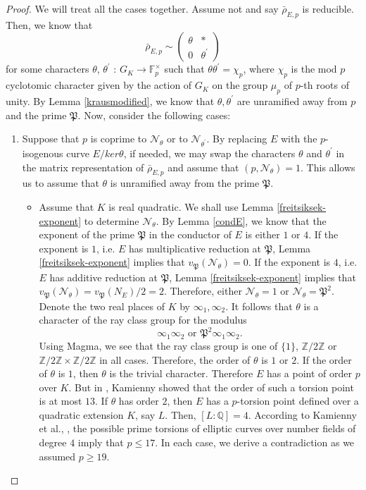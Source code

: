 \documentclass[]{article}
\newcommand {\ZZ}{{\mathbb{Z}}}
\newcommand {\QQ}{{\mathbb{Q}}}
\newcommand {\mfp}{{\mathfrak{P}}}
\newcounter{cases}
\begin{document}
\begin{proof}
We will treat all the cases together. Assume not and say $\bar{\rho}_{E, p}$ is reducible. Then, we know that $$
\bar{\rho}_{E, p} \sim\left(\begin{array}{cc}
\theta & * \\
0 & \theta^{\prime}
\end{array}\right)
$$
for some characters $\theta$, $\theta^{\prime}$ : $G_K \rightarrow \mathbb{F}_p^{\times}$ such that $\theta \theta^{\prime}=\chi_p$, where $\chi_p$ is the mod $p$ cyclotomic character given by the action of $G_K$ on the group $\mu_p$ of $p$-th roots of unity.
By Lemma \ref{krausmodified}, we know that $\theta, \theta^{\prime}$ are unramified away from $p$ and the prime $\mfp$. Now, consider the following cases:

\begin{enumerate}
    \item Suppose that $p$ is coprime to  $\mathcal{N}_\theta$ or to $\mathcal{N}_{\theta^{\prime}}$. By replacing $E$ with the $p$-isogenous curve $E/ker\theta$, if needed, we may swap the characters $\theta$ and $\theta^{\prime}$ in the matrix representation of $\bar{\rho}_{E, p}$ and assume that $(p, \mathcal{N}_\theta)=1$. This allows us to assume that $\theta$ is unramified away from the prime $\mfp$. 

    \begin{itemize}
        \item Assume that $K$ is real quadratic. We shall use Lemma \ref{freitsiksek-exponent} to determine $\mathcal{N}_\theta$. By Lemma \ref{condE}, we know that the exponent of the prime $\mfp$ in the conductor of $E$ is either $1$ or $4$. If the exponent is $1$, i.e. $E$ has multiplicative reduction at $\mfp$, Lemma \ref{freitsiksek-exponent} implies that $v_{\mfp}(\mathcal{N}_{\theta})=0$. If the exponent is $4$, i.e. $E$ has additive reduction at $\mfp$, Lemma \ref{freitsiksek-exponent} implies that $v_{\mfp}(\mathcal{N}_{\theta})=v_{\mfp}(N_E)/2=2$. Therefore, either $\mathcal{N}_{\theta}=1$ or $\mathcal{N}_{\theta}=\mfp^2$. Denote the two real places of $K$ by $\infty_1,\infty_2$. It follows that $\theta$ is a character of the ray class group for the modulus $$\infty_1\infty_2\text{ or }\mfp^2\infty_1\infty_2.$$Using Magma, we see that the ray class group is one of $\{1\}$, $\ZZ/2\ZZ$  or $\ZZ/2\ZZ\times \ZZ/2\ZZ$ in all cases. Therefore, the order of $\theta$ is $1$ or $2$. If the order of  $\theta$ is $1$, then $\theta$ is the trivial character. Therefore $E$ has a point of order $p$ over $K$. But in \cite[Theorem 3.1]{kamienny1992torsion}, Kamienny showed that the order of such a torsion point is at most $13$. If $\theta$ has order $2$, then $E$ has a $p$-torsion point defined over a quadratic extension $K$, say $L$. Then, $[L:\QQ]=4$. According to Kamienny et al., \cite{derickx2023torsion}, the possible prime torsions of elliptic curves over number fields of degree $4$ imply that $p\le17$. In each case, we derive a contradiction as we assumed $p\ge 19$.


\end{itemize}
\end{enumerate}
\end{proof}
\end{document}
